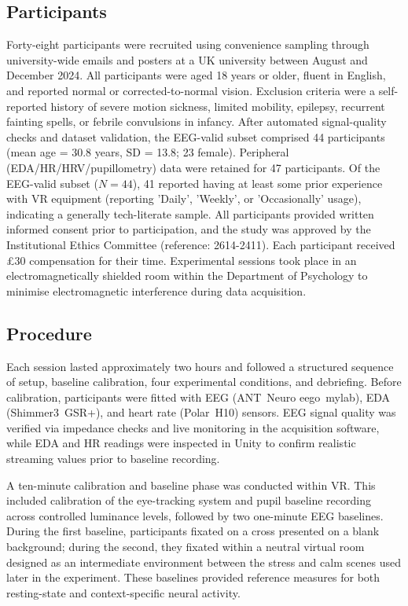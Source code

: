 \documentclass[lettersize,journal]{IEEEtran}
\begin{document}
\subsection{Participants}
\label{sec:participants}
Forty-eight participants were recruited using convenience sampling through university-wide emails and posters at a UK university between August and December 2024. 
All participants were aged 18 years or older, fluent in English, and reported normal or corrected-to-normal vision. 
Exclusion criteria were a self-reported history of severe motion sickness, limited mobility, epilepsy, recurrent fainting spells, or febrile convulsions in infancy. 
After automated signal-quality checks and dataset validation, the EEG-valid subset comprised 44 participants (mean age = 30.8 years, SD = 13.8; 23 female). Peripheral (EDA/HR/HRV/pupillometry) data were retained for 47 participants.
Of the EEG-valid subset ($N=44$), 41 reported having at least some prior experience with VR equipment (reporting 'Daily', 'Weekly', or 'Occasionally' usage), indicating a generally tech-literate sample.
All participants provided written informed consent prior to participation, and the study was approved by the Institutional Ethics Committee (reference: 2614-2411). 
Each participant received £30 compensation for their time. Experimental sessions took place in an electromagnetically shielded room within the Department of Psychology to minimise electromagnetic interference during data acquisition.

\subsection{Procedure}
Each session lasted approximately two hours and followed a structured sequence of setup, baseline calibration, four experimental conditions, and debriefing. Before calibration, participants were fitted with EEG (ANT~Neuro eego~mylab), EDA (Shimmer3~GSR+), and heart rate (Polar~H10) sensors. EEG signal quality was verified via impedance checks and live monitoring in the acquisition software, while EDA and HR readings were inspected in Unity to confirm realistic streaming values prior to baseline recording. 

A ten-minute calibration and baseline phase was conducted within VR. This included calibration of the eye-tracking system and pupil baseline recording across controlled luminance levels, followed by two one-minute EEG baselines. During the first baseline, participants fixated on a cross presented on a blank background; during the second, they fixated within a neutral virtual room designed as an intermediate environment between the stress and calm scenes used later in the experiment. These baselines provided reference measures for both resting-state and context-specific neural activity.
\end{document}
